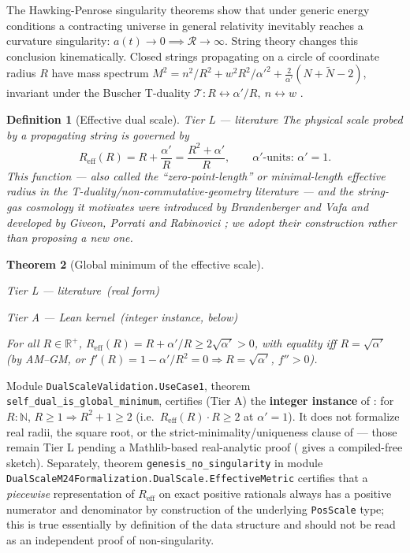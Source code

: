 \documentclass[11pt,a4paper]{article}
\newtheorem{theorem}{Theorem}[section]
\newtheorem{definition}[theorem]{Definition}
\theoremstyle{remark}
\newcommand{\tierA}{\colorbox{green!15}{\textsf{\scriptsize Tier A --- Lean kernel}}}
\newcommand{\tierL}{\colorbox{blue!10}{\textsf{\scriptsize Tier L --- literature}}}
\begin{document}
The Hawking-Penrose singularity theorems show that under generic energy conditions a contracting
universe in general relativity inevitably reaches a curvature singularity: $a(t)\to 0 \implies
\mathcal{R}\to\infty$. String theory changes this conclusion kinematically. Closed strings
propagating on a circle of coordinate radius $R$ have mass spectrum $M^2 = n^2/R^2 + w^2R^2/\alpha'^2
+ \tfrac{2}{\alpha'}(N+\tilde N - 2)$, invariant under the Buscher T-duality
$\mathcal{T}: R \leftrightarrow \alpha'/R,\ n\leftrightarrow w$ \cite{Buscher1987}.

\begin{definition}[Effective dual scale] \label{def:reff} \tierL
The physical scale probed by a propagating string is governed by
\begin{equation}
    R_{\mathrm{eff}}(R) = R + \frac{\alpha'}{R} = \frac{R^2+\alpha'}{R}, \qquad \alpha'\text{-units: } \alpha'=1.
\end{equation}
This function --- also called the ``zero-point-length'' or minimal-length effective radius in the
T-duality/non-commutative-geometry literature --- and the string-gas cosmology it motivates were
introduced by Brandenberger and Vafa \cite{BrandenbergerVafa1989} and developed by Giveon, Porrati
and Rabinovici \cite{GiveonPorratiRabinovici1994}; we adopt their construction rather than proposing
a new one.
\end{definition}

\begin{theorem}[Global minimum of the effective scale] \label{thm:reff-min}

\noindent\tierL\ (real form)

\noindent\tierA\ (integer instance, below)
\smallskip

\noindent
For all $R\in\mathbb{R}^{+}$, $R_{\mathrm{eff}}(R) = R+\alpha'/R \ge 2\sqrt{\alpha'} > 0$, with
equality iff $R=\sqrt{\alpha'}$ (by AM--GM, or $f'(R)=1-\alpha'/R^2=0 \Rightarrow R=\sqrt{\alpha'}$,
$f''>0$).
\end{theorem}

\begin{scopebox}
Module \texttt{DualScaleValidation.UseCase1}, theorem \texttt{self\_dual\_is\_global\_minimum},
certifies (Tier A) the \textbf{integer instance} of : for $R:\mathbb{N}$, $R\ge 1
\Rightarrow R^2+1\ge 2$ (i.e.\ $R_{\mathrm{eff}}(R)\cdot R \ge 2$ at $\alpha'=1$). It does not
formalize real radii, the square root, or the strict-minimality/uniqueness clause of
 --- those remain Tier L pending a Mathlib-based real-analytic proof
( gives a compiled-free sketch). Separately, theorem
\texttt{genesis\_no\_singularity} in module \texttt{DualScaleM24Formalization.DualScale.EffectiveMetric}
certifies that a \emph{piecewise} representation of $R_{\mathrm{eff}}$ on exact positive rationals
always has a positive numerator and denominator by construction of the underlying \texttt{PosScale}
type; this is true essentially by definition of the data structure and should not be read as an
independent proof of non-singularity.
\end{scopebox}
\end{document}
